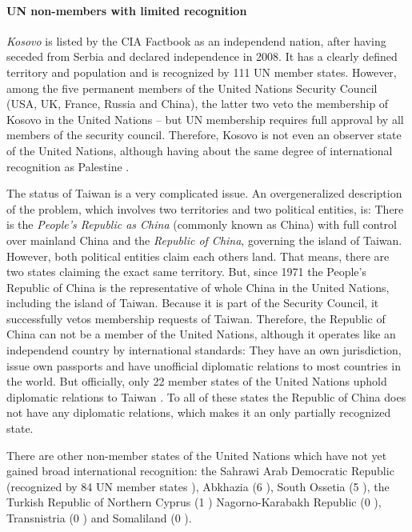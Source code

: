 
\paragraph{UN non-members with limited recognition} %
\label{par:un_non_members_with_limited_recognition}

\emph{Kosovo} is listed by the CIA Factbook as an independend nation, after having seceded from Serbia and declared independence in 2008. It has a clearly defined territory and population and is recognized by 111 UN member states. However, among the five permanent members of the United Nations Security Council (USA, UK, France, Russia and China), the latter two veto the membership of Kosovo in the United Nations -- but UN membership requires full approval by all members of the security council. Therefore, Kosovo is not even an observer state of the United Nations, although having about the same degree of international recognition as Palestine \cite{KosovoThanksYou}.

The status of Taiwan is a very complicated issue. An overgeneralized description of the problem, which involves two territories and two political entities, is: There is the \emph{People's Republic as China} (commonly known as China) with full control over mainland China and the \emph{Republic of China}, governing the island of Taiwan. However, both political entities claim each others land. That means, there are two states claiming the exact same territory. But, since 1971 the People's Republic of China is the representative of whole China in the United Nations, including the island of Taiwan. Because it is part of the Security Council, it successfully vetos membership requests of Taiwan. Therefore, the Republic of China can not be a member of the United Nations, although it operates like an independend country by international standards: They have an own jurisdiction, issue own passports and have unofficial diplomatic relations to most countries in the world. But officially, only 22 member states of the United Nations uphold diplomatic relations to Taiwan \cite{TaiwanRecognition}. To all of these states the Republic of China does not have any diplomatic relations, which makes it an only partially recognized state.

There are other non-member states of the United Nations which have not yet gained broad international recognition: the Sahrawi Arab Democratic Republic (recognized by 84 UN member states \cite{WesternSaharaRecognition}), Abkhazia (6 \cite{AbkhaziaRecognition}), South Ossetia (5 \cite{SouthOssetiaRecognition}), the Turkish Republic of Northern Cyprus (1 \cite{NorthernCyprusRecognition}) Nagorno-Karabakh Republic (0 \cite{NagornoRecognition}), Transnistria (0 \cite{TransnistriaRecognition}) and Somaliland (0 \cite{SomalilandRecognition}).


